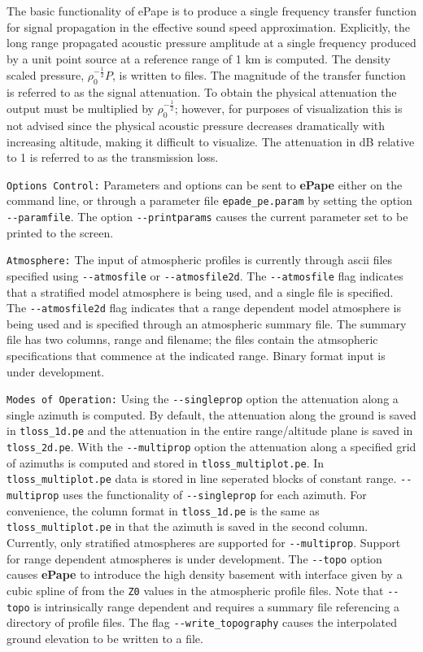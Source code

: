 The basic functionality of ePape is to produce a single frequency transfer function for signal propagation in the effective sound speed approximation. Explicitly, the long range propagated acoustic pressure amplitude at a single frequency produced by a unit point source at a reference range of 1 km is computed. The density scaled pressure, $\rho_0^{-\frac{1}{2}}P$, is written to files. The magnitude of the transfer function is referred to as the signal attenuation. To obtain the physical attenuation the output must be multiplied by $\rho_0^{-\frac{1}{2}}$; however, for purposes of visualization this is not advised since the physical acoustic pressure decreases dramatically with increasing altitude, making it difficult to visualize. The attenuation in dB relative to 1 is referred to as the transmission loss.

\verb+Options Control:+ Parameters and options can be sent to {\bf ePape} either on the command line, or through a parameter file \verb+epade_pe.param+ by setting the option \verb+--paramfile+. The option \verb+--printparams+ causes the current parameter set to be printed to the screen.

\verb+Atmosphere:+ The input of atmospheric profiles is currently through ascii files specified using \verb+--atmosfile+ or \verb+--atmosfile2d+. The \verb+--atmosfile+ flag indicates that a stratified model atmosphere is being used, and a single file is specified. The \verb+--atmosfile2d+ flag indicates that a range dependent model atmosphere is being used and is specified through an atmospheric summary file. The summary file has two columns, range and filename; the files contain the atmsopheric specifications that commence at the indicated range. Binary format input is under development.
 
\verb+Modes of Operation:+ Using the \verb+--singleprop+ option the attenuation along a single azimuth is computed. By default, the attenuation along the ground is saved in \verb+tloss_1d.pe+ and the attenuation in the entire range/altitude plane is saved in \verb+tloss_2d.pe+. With the \verb+--multiprop+ option the attenuation along a specified grid of azimuths is computed and stored in \verb+tloss_multiplot.pe+. In \verb+tloss_multiplot.pe+ data is stored in line seperated blocks of constant range. \verb+--multiprop+ uses the functionality of \verb+--singleprop+ for each azimuth. For convenience, the column format in \verb+tloss_1d.pe+ is the same as \verb+tloss_multiplot.pe+ in that the azimuth is saved in the second column. Currently, only stratified atmospheres are supported for \verb+--multiprop+. Support for range dependent atmospheres is under development. The \verb+--topo+ option causes {\bf ePape} to introduce the high density basement with interface given by a cubic spline of from the \verb+Z0+ values in the atmospheric profile files. Note that \verb+--topo+ is intrinsically range dependent and requires a summary file referencing a directory of profile files. The flag \verb+--write_topography+ causes the interpolated ground elevation to be written to a file. 

